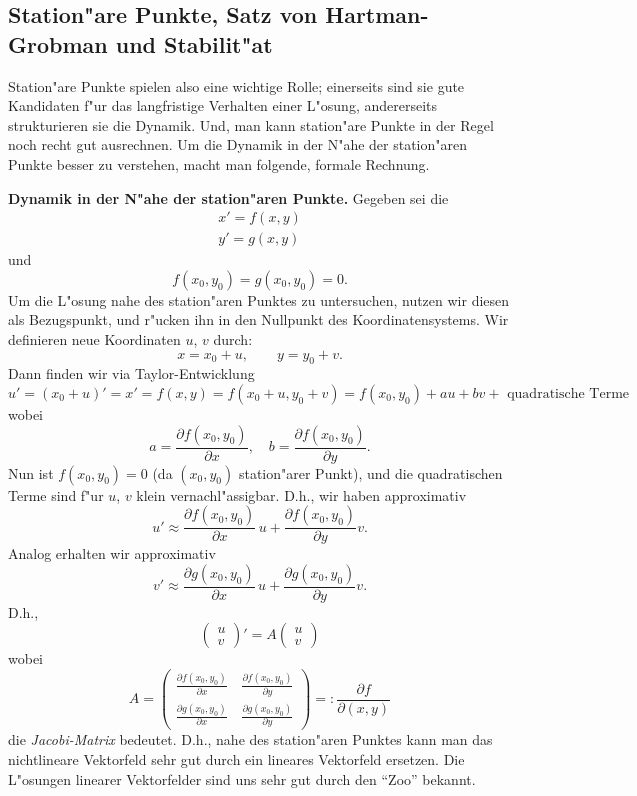\begin{auf}\chd\label{block6A1}

\end{auf}

\subsection{Station"are Punkte, Satz von Hartman-Grobman und Stabilit"at}
Station"are Punkte spielen also eine wichtige Rolle; einerseits sind sie
gute Kandidaten f"ur das langfristige Verhalten einer L"osung, andererseits
 strukturieren sie die Dynamik. Und, man kann station"are Punkte 
in der Regel noch recht 
gut ausrechnen. Um die Dynamik in der N"ahe der station"aren Punkte besser
zu verstehen, macht man folgende, formale Rechnung.

{\bf  Dynamik in der N"ahe der station"aren Punkte.} Gegeben sei die  
\begin{eqnarray*}
x' = f(x,y)\\
y' = g(x,y)
\end{eqnarray*}
und
$$ f(x_0,y_0)=g(x_0,y_0)=0.$$
Um die L"osung nahe des station"aren Punktes zu untersuchen, nutzen wir diesen als 
Bezugspunkt, und r"ucken ihn in den Nullpunkt des Koordinatensystems. Wir definieren 
neue Koordinaten $u$, $v$ durch:
$$ x=x_0+u,\qquad y = y_0+v.$$
Dann finden wir via Taylor-Entwicklung 
$$ u' = (x_0+u)' = x' = f(x,y) = f(x_0+u,y_0+v)
= f(x_0,y_0)+a u+ bv + \mbox{ quadratische Terme}
$$
wobei 
$$ a=\frac{\partial f(x_0,y_0)}{\partial x},\quad b=\frac{\partial f(x_0,y_0)}{\partial y}.$$
Nun ist $f(x_0,y_0)=0$ (da $(x_0,y_0)$ station"arer Punkt), und die quadratischen 
Terme sind f"ur $u$, $v$ klein vernachl"assigbar. D.h., wir haben
approximativ
$$ u' \approx \frac{\partial f(x_0,y_0)}{\partial x}\, u+
\frac{\partial f(x_0,y_0)}{\partial y} v.$$
Analog erhalten wir approximativ
$$ v' \approx \frac{\partial g(x_0,y_0)}{\partial x}\, u+
\frac{\partial g(x_0,y_0)}{\partial y} v.$$
D.h.,
$$\left(\begin{array}{c}
u\\v
\end{array}
\right)'
= A \left(\begin{array}{c}
u\\v
\end{array}
\right)$$
wobei
$$ A = 
\left(\begin{array}{cc}
 \frac{\partial f(x_0,y_0)}{\partial x}\,&
\frac{\partial f(x_0,y_0)}{\partial y}\\
\frac{\partial g(x_0,y_0)}{\partial x}\, &
\frac{\partial g(x_0,y_0)}{\partial y} 
\end{array}
\right) =: \frac{\partial f}{\partial (x,y)}$$
die \emph{Jacobi-Matrix} bedeutet. D.h., nahe des station"aren Punktes kann man das 
nichtlineare Vektorfeld sehr gut durch ein lineares Vektorfeld ersetzen. 
Die L"osungen linearer Vektorfelder sind uns sehr gut durch den ``Zoo'' bekannt. 

